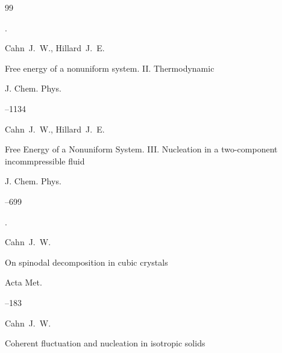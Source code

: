 \begin{thebibliography}{99}
\moreref 

. \nofrills






\by Cahn~J.~W., Hillard~J.~E.

\paper Free energy of a nonuniform system. II. Thermodynamic

\jour J. Chem. Phys.




--1134







\by Cahn~J.~W., Hillard~J.~E.

\paper Free Energy of a Nonuniform System. III. Nucleation in a two-component incommpressible fluid

\jour J. Chem. Phys.




--699


\moreref 

. \nofrills








\by Cahn~J.~W.

\paper On spinodal decomposition in cubic crystals

\jour Acta Met.




--183







\by Cahn~J.~W.

\paper Coherent fluctuation and nucleation in isotropic solids


\end{thebibliography}
